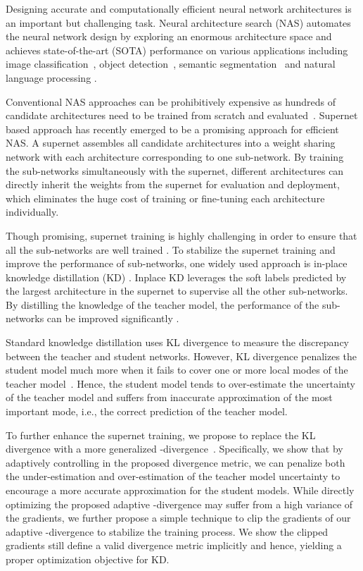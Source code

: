 \documentclass{article}
\begin{document}
Designing accurate and computationally efficient neural network architectures is an important but challenging task. Neural architecture search (NAS) automates the neural network design by exploring an enormous architecture space and achieves state-of-the-art (SOTA) performance on various applications including image classification~\citep{zoph2016neural, zoph2018learning}, object detection~\citep{ghiasi2019fpn}, semantic segmentation~\citep{zhang2019customizable} 
and natural language processing \citep{wang2020hat}. 

Conventional NAS approaches can be prohibitively expensive as hundreds of candidate architectures need to be trained from scratch and evaluated~\citep[e.g.,][]{tan2019mnasnet, zoph2018learning}. Supernet based approach has recently emerged to be a promising approach for efficient NAS. A supernet assembles all candidate architectures into a weight sharing network with each architecture corresponding to one sub-network. By training the sub-networks simultaneously with the supernet, different architectures can directly inherit the weights from the supernet for evaluation and deployment, which eliminates the huge cost of training or fine-tuning each architecture individually.

Though promising, supernet training is highly challenging in order to ensure that all the sub-networks are well trained \citep[e.g.,][]{yu2020bignas, cai2019once, wang2020attentivenas}. To stabilize the supernet training and improve the performance of sub-networks, one widely used approach is in-place knowledge distillation (KD) \citep{yu2019universally}. Inplace KD leverages the soft labels predicted by the largest architecture in the supernet to supervise all the other sub-networks. By distilling the knowledge of the teacher model, the performance of the sub-networks can be improved significantly \citep{yu2019universally, yu2020bignas}. 

Standard knowledge distillation uses KL divergence to measure the discrepancy between the teacher and student networks. However, KL divergence penalizes the student model much more when it fails to cover one or more local modes of the teacher model~\citep{murphy2012machine}. Hence, the student model tends to over-estimate the uncertainty of the teacher model and suffers from inaccurate approximation of the most important mode, i.e., the correct prediction of the teacher model. 


To further enhance the supernet training, we propose to replace the KL divergence with a more generalized -divergence~\citep{amari1985differential, minka2005divergence}. 
Specifically, we show that by adaptively controlling  in the proposed divergence metric, we can penalize both the under-estimation and over-estimation of the teacher model uncertainty to encourage a more accurate approximation for the student models. 
While directly optimizing the proposed adaptive -divergence may suffer from a high variance of the gradients, we further propose a simple technique to clip the gradients of our adaptive -divergence to stabilize the training process.
We show the clipped gradients still define a valid divergence metric implicitly and hence, yielding a proper optimization objective for KD. 
\end{document}
